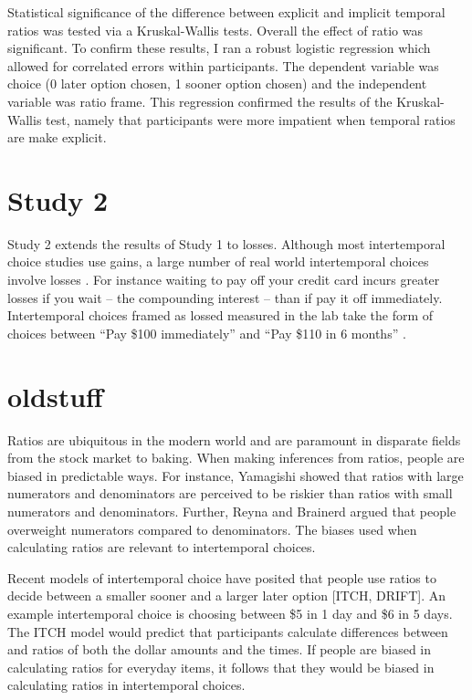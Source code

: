 \documentclass[]{article}
\begin{document}
Statistical significance of  the difference between explicit and implicit temporal ratios was tested via a Kruskal-Wallis tests.
 Overall the effect of ratio was significant. 
 To confirm these results, I ran a robust logistic regression which allowed for correlated errors within participants.
 The dependent variable was choice (0 later option chosen, 1 sooner option chosen) and the independent variable was ratio frame. 
 This regression confirmed the results of the Kruskal-Wallis test, namely that participants were more impatient when temporal ratios are make explicit. 
 

\section{Study 2}

Study 2 extends the results of Study 1 to losses. 
Although most intertemporal choice studies use gains, a large number of real world intertemporal choices involve losses \cite{Hardisty2013}. 
For instance waiting to pay off your credit card incurs greater losses if you wait -- the compounding interest -- than if pay it off immediately.
Intertemporal choices framed as lossed measured in the lab take the form of choices between ``Pay \$100 immediately'' and  ``Pay \$110 in 6 months'' \cite{Hardisty2015}.



\section{oldstuff}


Ratios are ubiquitous in the modern world and are paramount in disparate fields from the stock market to baking. 
When making inferences from ratios, people are biased in predictable ways.
For instance, Yamagishi showed that ratios with large numerators and denominators are perceived to be riskier than ratios with small numerators and denominators. Further, Reyna and Brainerd argued that people overweight numerators compared to denominators.
The biases used when calculating ratios are relevant to intertemporal choices. 

Recent models of intertemporal choice have posited that people use ratios to decide between a smaller sooner and a larger later option [ITCH, DRIFT]. 
An example intertemporal choice is choosing between \$5 in 1 day and \$6 in 5 days. 
The ITCH model would predict that participants calculate differences between and ratios of both the dollar amounts and the times. 
If people are biased in calculating ratios for everyday items, it follows that they would be biased in calculating ratios in intertemporal choices. 
\end{document}
